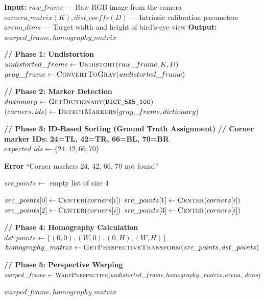 \begin{algorithm}[H]
\caption{Homography Estimation and Perspective Warping}
\label{alg:homography_warping}
\begin{algorithmic}[1]

\State \textbf{Input:}
\State \hspace{1em} $raw\_frame$ — Raw RGB image from the camera
\State \hspace{1em} $camera\_matrix (K), dist\_coeffs (D)$ — Intrinsic calibration parameters
\State \hspace{1em} $arena\_dims$ — Target width and height of bird's-eye view
\State \textbf{Output:} $warped\_frame, homography\_matrix$

\Statex
\State \textbf{// Phase 1: Undistortion}
\State $undistorted\_frame \gets \textsc{Undistort}(raw\_frame, K, D)$
\State $gray\_frame \gets \textsc{ConvertToGray}(undistorted\_frame)$

\Statex
\State \textbf{// Phase 2: Marker Detection}
\State $dictionary \gets \textsc{GetDictionary}(\texttt{DICT\_5X5\_100})$
\State $(corners, ids) \gets \textsc{DetectMarkers}(gray\_frame, dictionary)$

\Statex
\State \textbf{// Phase 3: ID-Based Sorting (Ground Truth Assignment)}
\State \textbf{// Corner marker IDs: 24=TL, 42=TR, 66=BL, 70=BR}
\State $expected\_ids \gets \{24, 42, 66, 70\}$

    \State \Return \textbf{Error} ``Corner markers 24, 42, 66, 70 not found''
\EndIf

\State $src\_points \gets$ empty list of size $4$

        \State $src\_points[0] \gets \textsc{Center}(corners[i])$ 
        \State $src\_points[1] \gets \textsc{Center}(corners[i])$ 
        \State $src\_points[2] \gets \textsc{Center}(corners[i])$ 
        \State $src\_points[3] \gets \textsc{Center}(corners[i])$ 
    \EndIf
\EndFor

\Statex
\State \textbf{// Phase 4: Homography Calculation}
\State $dst\_points \gets \{(0,0), (W,0), (0,H), (W,H)\}$ 
\State $homography\_matrix \gets \textsc{GetPerspectiveTransform}(src\_points, dst\_points)$

\Statex
\State \textbf{// Phase 5: Perspective Warping}
\State $warped\_frame \gets \textsc{WarpPerspective}(undistorted\_frame, homography\_matrix, arena\_dims)$

\State \Return $warped\_frame, homography\_matrix$
\EndFunction

\end{algorithmic}
\end{algorithm}

